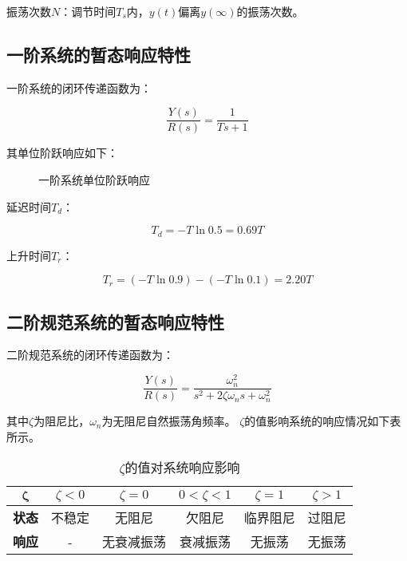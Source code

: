 \documentclass[cn, blue, normal, 12pt]{elegantnote}
\begin{document}
振荡次数$N$：调节时间$T_s$内，$y(t)$偏离$y(\infty)$的振荡次数。

\subsection{一阶系统的暂态响应特性}

一阶系统的闭环传递函数为：

\begin{equation}
    \frac{Y(s)}{R(s)}=\frac{1}{Ts+1}
\end{equation}

其单位阶跃响应如下：

\begin{figure}[htbp]
    \centering
    \caption{一阶系统单位阶跃响应}
    
\end{figure}

延迟时间$T_d$：

\begin{equation}
    T_d=-T\ln{0.5}=0.69T
\end{equation}

上升时间$T_r$：

\begin{equation}
    T_r=(-T\ln{0.9})-(-T\ln{0.1})=2.20T
\end{equation}

\subsection{二阶规范系统的暂态响应特性}

二阶规范系统的闭环传递函数为：

\begin{equation}
    \frac{Y(s)}{R(s)}=\frac{\omega_n^2}{s^2+2\zeta\omega_n s+\omega_n^2}
\end{equation}

其中$\zeta$为阻尼比，$\omega_n$为无阻尼自然振荡角频率。
$\zeta$的值影响系统的响应情况如下表所示。

\begin{table}[htbp]
    \label{tab:zeta}
    \begin{center}
      \caption{$\zeta$的值对系统响应影响}
      \begin{tabular}{c|c|c|c|c|c}
        \hline
        $\bm{\zeta}$ & $\zeta<0$ & $\zeta=0$ & $0<\zeta<1$ & $\zeta=1$ & $\zeta>1$ \\
        \hline
        \textbf{状态} & 不稳定 & 无阻尼 & 欠阻尼 & 临界阻尼 & 过阻尼 \\
        \hline
        \textbf{响应} & - & 无衰减振荡 & 衰减振荡 & 无振荡 & 无振荡 \\
        \hline
      \end{tabular}
    \end{center}
\end{table}
\end{document}

